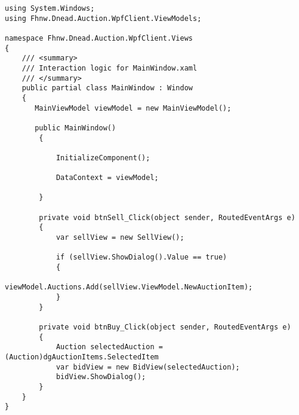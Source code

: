 \documentclass[a4paper,10pt]{scrreprt}
\begin{document}
\begin{lstlisting}[caption= Using a viewModel in View]
 using System.Windows;
using Fhnw.Dnead.Auction.WpfClient.ViewModels;

namespace Fhnw.Dnead.Auction.WpfClient.Views
{
    /// <summary>
    /// Interaction logic for MainWindow.xaml
    /// </summary>
    public partial class MainWindow : Window
    {
       MainViewModel viewModel = new MainViewModel();

       public MainWindow()
        {

            InitializeComponent();

            DataContext = viewModel;

        }

        private void btnSell_Click(object sender, RoutedEventArgs e)
        {
            var sellView = new SellView();

            if (sellView.ShowDialog().Value == true)
            {
                viewModel.Auctions.Add(sellView.ViewModel.NewAuctionItem);
            }
        }

        private void btnBuy_Click(object sender, RoutedEventArgs e)
        {
            Auction selectedAuction = (Auction)dgAuctionItems.SelectedItem
            var bidView = new BidView(selectedAuction);
            bidView.ShowDialog();
        }
    }
}
\end{lstlisting}
\end{document}
